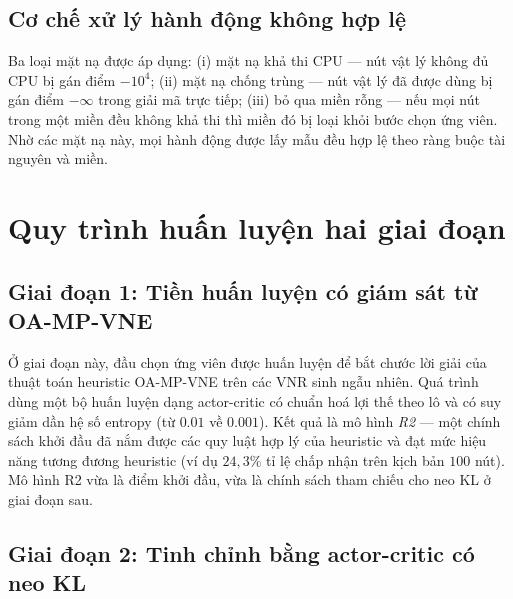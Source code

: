 \documentclass[../DoAn.tex]{subfiles}
\begin{document}
\subsection{Cơ chế xử lý hành động không hợp lệ}
\label{subsec:env-mask}

Ba loại mặt nạ được áp dụng: (i) mặt nạ khả thi CPU — nút vật lý không đủ CPU bị gán điểm $-10^4$; (ii) mặt nạ chống trùng — nút vật lý đã được dùng bị gán điểm $-\infty$ trong giải mã trực tiếp; (iii) bỏ qua miền rỗng — nếu mọi nút trong một miền đều không khả thi thì miền đó bị loại khỏi bước chọn ứng viên. Nhờ các mặt nạ này, mọi hành động được lấy mẫu đều hợp lệ theo ràng buộc tài nguyên và miền.

\section{Quy trình huấn luyện hai giai đoạn}   %
\label{sec:training}

\subsection{Giai đoạn 1: Tiền huấn luyện có giám sát từ OA-MP-VNE}
\label{subsec:train-il}

Ở giai đoạn này, đầu chọn ứng viên được huấn luyện để bắt chước lời giải của thuật toán heuristic OA-MP-VNE trên các VNR sinh ngẫu nhiên. Quá trình dùng một bộ huấn luyện dạng actor-critic có chuẩn hoá lợi thế theo lô và có suy giảm dần hệ số entropy (từ $0.01$ về $0.001$). Kết quả là mô hình \textit{R2} — một chính sách khởi đầu đã nắm được các quy luật hợp lý của heuristic và đạt mức hiệu năng tương đương heuristic (ví dụ $24{,}3\%$ tỉ lệ chấp nhận trên kịch bản $100$ nút). Mô hình R2 vừa là điểm khởi đầu, vừa là chính sách tham chiếu cho neo KL ở giai đoạn sau.

\subsection{Giai đoạn 2: Tinh chỉnh bằng actor-critic có neo KL}
\label{subsec:train-ac}
\end{document}
